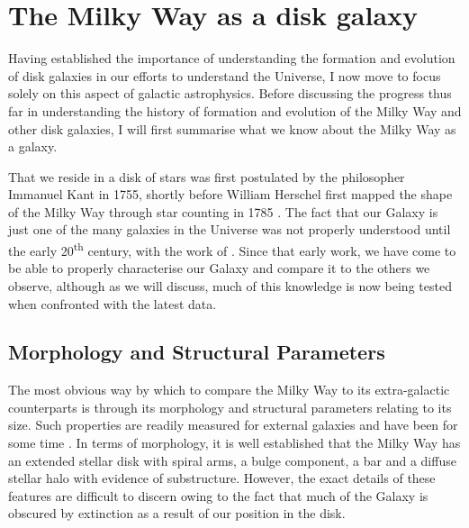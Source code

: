 \section{The Milky Way as a disk galaxy}


Having established the importance of understanding the formation and evolution of disk galaxies in our efforts to understand the Universe, I now move to focus solely on this aspect of galactic astrophysics. Before discussing the progress thus far in understanding the history of formation and evolution of the Milky Way and other disk galaxies, I will first summarise what we know about the Milky Way as a galaxy. 

That we reside in a disk of stars was first postulated by the philosopher Immanuel Kant in 1755, shortly before William Herschel first mapped the shape of the Milky Way through star counting in 1785 \citep{Herschel01011785}. The fact that our Galaxy is just one of the many galaxies in the Universe was not properly understood until the early 20\textsuperscript{th} century, with the work of \citet{1929ApJ....69..103H}. Since that early work, we have come to be able to properly characterise our Galaxy and compare it to the others we observe, although as we will discuss, much of this knowledge is now being tested when confronted with the latest data.

\subsection{Morphology and Structural Parameters}

The most obvious way by which to compare the Milky Way to its extra-galactic counterparts is through its morphology and structural parameters relating to its size. Such properties are readily measured for external galaxies and have been for some time \citep[e.g.][]{1959HDP....53..311D}. In terms of morphology, it is well established that the Milky Way has an extended stellar disk with spiral arms, a bulge component, a bar and a diffuse stellar halo with evidence of substructure. However, the exact details of these features are difficult to discern owing to the fact that much of the Galaxy is obscured by extinction as a result of our position in the disk.

